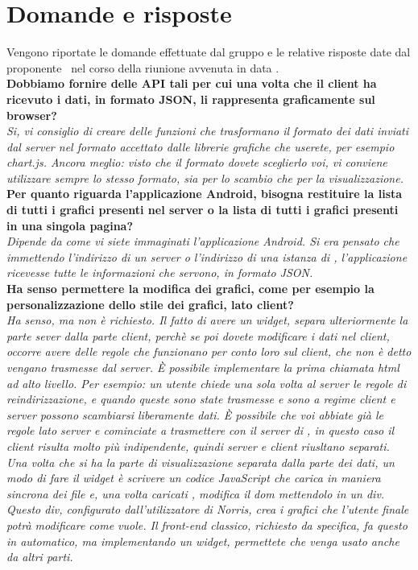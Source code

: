 \section{Domande e risposte}
	Vengono riportate le domande effettuate dal gruppo \groupname{} e le relative risposte date dal proponente \proponente\, nel corso della riunione avvenuta in data .\\

	\textbf{Dobbiamo fornire delle API tali per cui una volta che il client ha ricevuto i dati, in formato JSON, li rappresenta graficamente sul browser?}\\
	\textit{Si, vi consiglio di creare delle funzioni che trasformano il formato dei dati inviati dal server nel formato accettato dalle librerie grafiche che userete, per esempio chart.js. Ancora meglio: visto che il formato dovete sceglierlo voi, vi conviene utilizzare sempre lo stesso formato, sia per lo scambio che per la visualizzazione.}\\

	\textbf{Per quanto riguarda l'applicazione Android, bisogna restituire la lista di tutti i grafici presenti nel server o la lista di tutti i grafici presenti in una singola pagina?}\\
	\textit{Dipende da come vi siete immaginati l'applicazione Android. Si era pensato che immettendo l'indirizzo di un server o l'indirizzo di una istanza di \projectname{}, l'applicazione ricevesse tutte le informazioni che servono, in formato JSON.}\\

	\textbf{Ha senso permettere la modifica dei grafici, come per esempio la personalizzazione dello stile dei grafici, lato client?}\\
	\textit{Ha senso, ma non è richiesto. Il fatto di avere un widget, separa ulteriormente la parte sever dalla parte client, perchè se poi dovete modificare i dati nel client, occorre avere delle regole che funzionano per conto loro sul client, che non è detto vengano trasmesse dal server. \`{E} possibile implementare la prima chiamata html ad alto livello. Per esempio: un utente chiede una sola volta al server le regole di reindirizzazione, e quando queste sono state trasmesse e sono a regime client e server possono scambiarsi liberamente dati. \`{E} possibile che voi abbiate già le regole lato server e cominciate a trasmettere con il server di \projectname{}, in questo caso il client risulta molto più indipendente, quindi server e client riusltano separati. Una volta che si ha la parte di visualizzazione separata dalla parte dei dati, un modo di fare il widget è scrivere un codice JavaScript che carica in maniera sincrona dei file e, una volta caricati , modifica il dom mettendolo in un div. Questo div, configurato dall'utilizzatore di Norris, crea i grafici che l'utente finale potrà modificare come vuole. Il front-end classico, richiesto da specifica, fa questo in automatico, ma implementando un widget, permettete che venga usato anche da altri parti.}\\